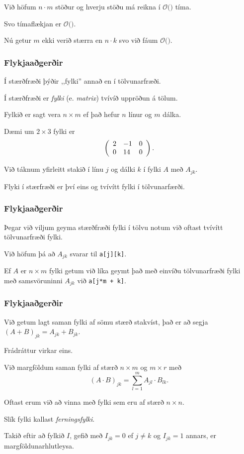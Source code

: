 {
}

{
	{
		\item<1-> Við höfum $n \cdot m$ stöður og hverju stöðu má reikna í $\mathcal{O}($$)$ tíma.
		\item<3-> Svo tímaflækjan er $\mathcal{O}($\onslide<4->{$n \cdot m \cdot k$}$)$.
		\item<5-> Nú getur $m$ ekki verið stærra en $n \cdot k$ svo við fáum $\mathcal{O}($\onslide<6->{$n^2 \cdot k^2$}$)$.
	}
}


{
	\frametitle{Flykjaaðgerðir}
	{
		\item<1-> Í stærðfræði þýðir ,,fylki'' annað en í tölvunarfræði.
		\item<2-> Í stærðfræði er \emph{fylki} (e. \emph{matrix}) tvívíð uppröðun á tölum.
		\item<3-> Fylkið er sagt vera $n \times m$ ef það hefur $n$ línur og $m$ dálka.
		\item<4-> Dæmi um $2 \times 3$ fylki er
		\[
			\left (
			\env{array}
			{ {l l l}
				2 & -1 & 0\\
				0 & 14 & 0
			}
			\right ).
		\]
		\item<5-> Við táknum yfirleitt stakið í línu $j$ og dálki $k$ í fylki $A$ með $A_{jk}$.
		\item<6-> Flyki í stærfræði er því eins og tvívítt fylki í tölvunarfærði.
	}
}

{
	\frametitle{Flykjaaðgerðir}
	{
		\item<1-> Þegar við viljum geyma stærðfræði fylki í tölvu notum við oftast tvívítt tölvunarfræði fylki.
		\item<2-> Við höfum þá að $A_{jk}$ svarar til \texttt{a[j][k]}.
		\item<3-> Ef $A$ er $n \times m$ fylki getum við líka geymt það með einvíðu tölvunarfræði fylki með samsvöruninni $A_{jk}$ við
					\texttt{a[j*m + k]}.
	}
}

{
	\frametitle{Flykjaaðgerðir}
	{
		\item<1-> Við getum lagt saman fylki af sömu stærð stakvíst, það er að segja $(A + B)_{jk} = A_{jk} + B_{jk}$.
		\item<2-> Frádráttur virkar eins.
		\item<3-> Við margföldum saman fylki af stærð $n \times m$ og $m \times r$ með
		\[
			(A \cdot B)_{jk} = \sum_{l = 1}^m A_{jl} \cdot B_{lk}.
		\]
		\item<4-> Oftast erum við að vinna með fylki sem eru af stærð $n \times n$.
		\item<5-> Slík fylki kallast \emph{ferningsfylki}.
		\item<6-> Takið eftir að fylkið $I$, gefið með $I_{jk} = 0$ ef $j \neq k$ og $I_{jk} = 1$ annars, er margföldunarhlutleysa.
	}
}

